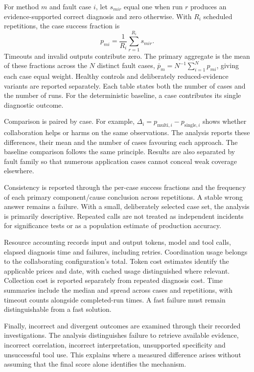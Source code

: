 For method $m$ and fault case $i$, let $s_{mir}$ equal one when run $r$
produces an evidence-supported correct diagnosis and zero otherwise.
With $R_i$ scheduled repetitions, the case success fraction is
\begin{equation}
\label{eq:methodology:case-success}
p_{mi}=\frac{1}{R_i}\sum_{r=1}^{R_i}s_{mir}.
\end{equation}
Timeouts and invalid outputs contribute zero. The primary aggregate is
the mean of these fractions across the $N$ distinct fault cases,
$\bar p_m=N^{-1}\sum_{i=1}^{N}p_{mi}$, giving each case equal weight.
Healthy controls and deliberately reduced-evidence variants are reported
separately. Each table states both the number of cases and the number of
runs. For the deterministic baseline, a case contributes its single
diagnostic outcome.

Comparison is paired by case. For example,
$\Delta_i=p_{\mathrm{multi},i}-p_{\mathrm{single},i}$ shows whether
collaboration helps or harms on the same observations. The analysis
reports these differences, their mean and the number of cases favouring
each approach. The baseline comparison follows the same principle.
Results are also separated by fault family so that numerous application
cases cannot conceal weak coverage elsewhere.

Consistency is reported through the per-case success fractions and the
frequency of each primary component/cause conclusion across repetitions.
A stable wrong answer remains a failure. With a small, deliberately
selected case set, the analysis is primarily descriptive. Repeated calls
are not treated as independent incidents for significance tests or as a
population estimate of production accuracy.

Resource accounting records input and output tokens, model and tool calls,
elapsed diagnosis time and failures, including retries. Coordination
usage belongs to the collaborating configuration's total. Token cost
estimates identify the applicable prices and date, with cached usage
distinguished where relevant. Collection cost is reported separately from
repeated diagnosis cost. Time summaries include the median and spread
across cases and repetitions, with timeout counts alongside completed-run
times. A fast failure must remain distinguishable from a fast solution.

Finally, incorrect and divergent outcomes are examined through their
recorded investigations. The analysis distinguishes failure to retrieve
available evidence, incorrect correlation, incorrect interpretation,
unsupported specificity and unsuccessful tool use. This explains where
a measured difference arises without assuming that the final score alone
identifies the mechanism.

